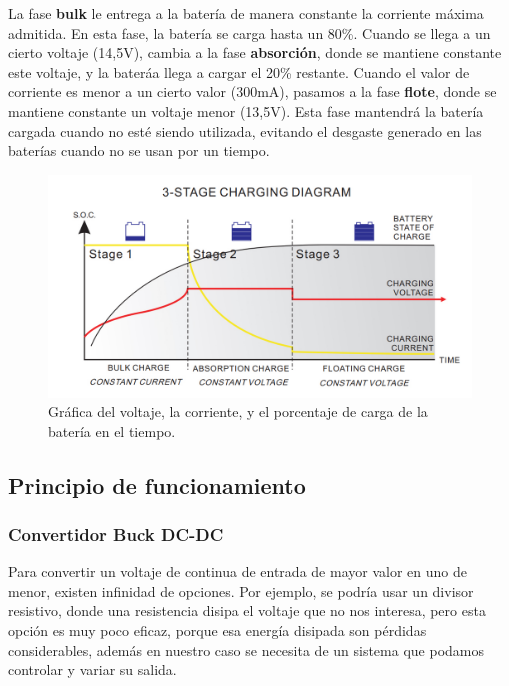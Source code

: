 La fase \textbf{bulk} le entrega a la batería de manera constante la corriente máxima admitida. En esta fase, la batería se carga hasta un 80\%. Cuando se llega a un cierto voltaje (14,5V), cambia a la fase \textbf{absorción}, donde se mantiene constante este voltaje, y la bateráa llega a cargar el 20\% restante. Cuando el valor de corriente  es menor a un cierto valor (300mA), pasamos a la fase \textbf{flote}, donde se mantiene constante un voltaje menor (13,5V). Esta fase mantendrá la batería cargada cuando no esté siendo utilizada, evitando el desgaste generado en las baterías cuando no se usan por un tiempo.

\begin{figure}[H]
    \centering
    \includegraphics[width=0.95\linewidth]{MPPT/5a9f8145-6356-4504-b0b6-9d73450df4c1.jpg}
    \caption{Gráfica del voltaje, la corriente, y el porcentaje de carga de la batería en el tiempo.}
    \label{fig:grafica-carga}
\end{figure}

\subsection{Principio de funcionamiento}

\subsubsection{Convertidor Buck DC-DC}
Para convertir un voltaje de continua de entrada de mayor valor en uno de menor, existen infinidad de opciones. Por ejemplo, se podría usar un divisor resistivo, donde una resistencia disipa el voltaje que no nos interesa, pero esta opción es muy poco eficaz, porque esa energía disipada son pérdidas considerables, además en nuestro caso se necesita de un sistema que podamos controlar y variar su salida. \\

